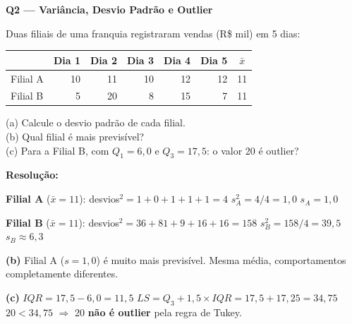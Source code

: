\begin{SolvedBox}
\textbf{Q2 — Variância, Desvio Padrão e Outlier}

Duas filiais de uma franquia registraram vendas (R\$ mil) em 5 dias:

\begin{center}
\begin{tabular}{|l|r|r|r|r|r|c|}
\hline
& Dia 1 & Dia 2 & Dia 3 & Dia 4 & Dia 5 & $\bar{x}$ \\
\hline
Filial A & 10 & 11 & 10 & 12 & 12 & 11 \\
Filial B & 5 & 20 & 8 & 15 & 7 & 11 \\
\hline
\end{tabular}
\end{center}

(a) Calcule o desvio padrão de cada filial.\\
(b) Qual filial é mais previsível?\\
(c) Para a Filial B, com $Q_1 = 6{,}0$ e $Q_3 = 17{,}5$: o valor 20 é outlier?

\textbf{Resolução:}

\textbf{Filial A} ($\bar{x}=11$): desvios$^2 = 1+0+1+1+1 = 4$ \quad
$s_A^2 = 4/4 = 1{,}0$ \quad $s_A = 1{,}0$

\textbf{Filial B} ($\bar{x}=11$): desvios$^2 = 36+81+9+16+16 = 158$ \quad
$s_B^2 = 158/4 = 39{,}5$ \quad $s_B \approx 6{,}3$

\textbf{(b)} Filial A ($s=1{,}0$) é muito mais previsível. Mesma média,
comportamentos completamente diferentes.

\textbf{(c)} $IQR = 17{,}5 - 6{,}0 = 11{,}5$ \quad
$LS = Q_3 + 1{,}5 \times IQR = 17{,}5 + 17{,}25 = 34{,}75$\\
$20 < 34{,}75$ $\Rightarrow$ 20 \textbf{não é outlier} pela regra de Tukey.
\end{SolvedBox}

